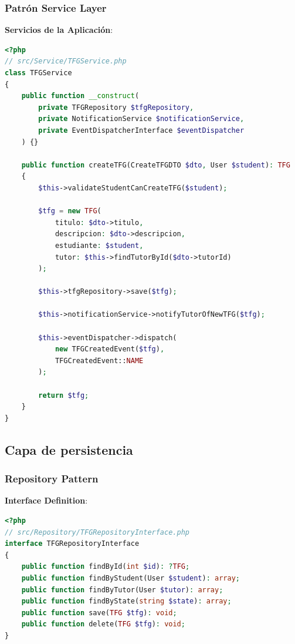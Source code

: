 \documentclass[12pt,a4paper,oneside]{report}
\begin{document}
\subsubsection{Patrón Service Layer}\label{patruxf3n-service-layer}

\textbf{Servicios de la Aplicación}:

\begin{lstlisting}[language=PHP]
<?php
// src/Service/TFGService.php
class TFGService
{
    public function __construct(
        private TFGRepository $tfgRepository,
        private NotificationService $notificationService,
        private EventDispatcherInterface $eventDispatcher
    ) {}
    
    public function createTFG(CreateTFGDTO $dto, User $student): TFG
    {
        $this->validateStudentCanCreateTFG($student);
        
        $tfg = new TFG(
            titulo: $dto->titulo,
            descripcion: $dto->descripcion,
            estudiante: $student,
            tutor: $this->findTutorById($dto->tutorId)
        );
        
        $this->tfgRepository->save($tfg);
        
        $this->notificationService->notifyTutorOfNewTFG($tfg);
        
        $this->eventDispatcher->dispatch(
            new TFGCreatedEvent($tfg),
            TFGCreatedEvent::NAME
        );
        
        return $tfg;
    }
}
\end{lstlisting}

\subsection{Capa de persistencia}\label{capa-de-persistencia}

\subsubsection{Repository Pattern}\label{repository-pattern}

\textbf{Interface Definition}:

\begin{lstlisting}[language=PHP]
<?php
// src/Repository/TFGRepositoryInterface.php
interface TFGRepositoryInterface
{
    public function findById(int $id): ?TFG;
    public function findByStudent(User $student): array;
    public function findByTutor(User $tutor): array;
    public function findByState(string $state): array;
    public function save(TFG $tfg): void;
    public function delete(TFG $tfg): void;
}
\end{lstlisting}
\end{document}
